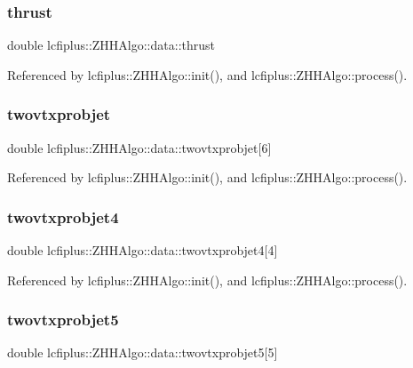 \subsubsection{thrust}
{\footnotesize\ttfamily double lcfiplus\+::\+Z\+H\+H\+Algo\+::data\+::thrust}



Referenced by lcfiplus\+::\+Z\+H\+H\+Algo\+::init(), and lcfiplus\+::\+Z\+H\+H\+Algo\+::process().

\mbox{\label{structlcfiplus_1_1ZHHAlgo_1_1data_a6fcd6001587f0ade08739d44147c14bf}} 
\subsubsection{twovtxprobjet}
{\footnotesize\ttfamily double lcfiplus\+::\+Z\+H\+H\+Algo\+::data\+::twovtxprobjet[6]}



Referenced by lcfiplus\+::\+Z\+H\+H\+Algo\+::init(), and lcfiplus\+::\+Z\+H\+H\+Algo\+::process().

\mbox{\label{structlcfiplus_1_1ZHHAlgo_1_1data_ab551da4fd733e922a5e1cc0224042b8b}} 
\subsubsection{twovtxprobjet4}
{\footnotesize\ttfamily double lcfiplus\+::\+Z\+H\+H\+Algo\+::data\+::twovtxprobjet4[4]}



Referenced by lcfiplus\+::\+Z\+H\+H\+Algo\+::init(), and lcfiplus\+::\+Z\+H\+H\+Algo\+::process().

\mbox{\label{structlcfiplus_1_1ZHHAlgo_1_1data_a126a3e1d478de1f31e34c7712ffacee8}} 
\subsubsection{twovtxprobjet5}
{\footnotesize\ttfamily double lcfiplus\+::\+Z\+H\+H\+Algo\+::data\+::twovtxprobjet5[5]}



